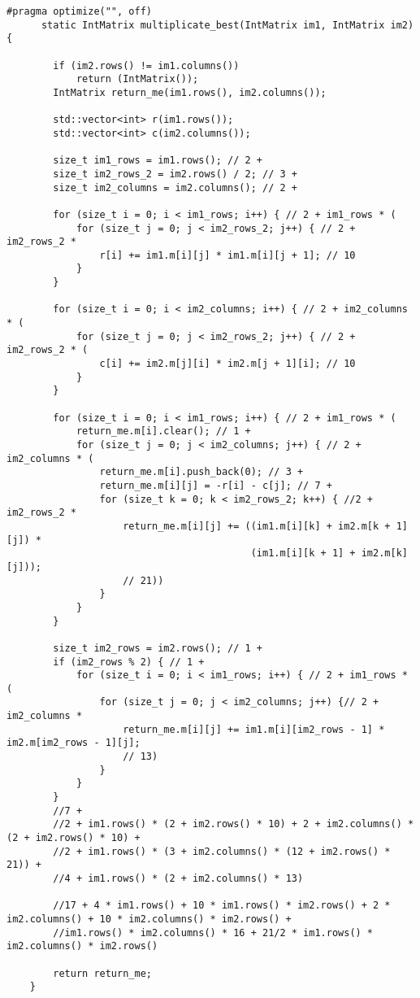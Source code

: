 \documentclass[a4paper, 14pt]{article}
\begin{document}
	\newpage
	\begin{lstlisting}[label=matrix-lev,caption=Алгоритм Виноградова с оптимизациями]
  #pragma optimize("", off)
      static IntMatrix multiplicate_best(IntMatrix im1, IntMatrix im2) {

        if (im2.rows() != im1.columns())
            return (IntMatrix());
        IntMatrix return_me(im1.rows(), im2.columns());

        std::vector<int> r(im1.rows());
        std::vector<int> c(im2.columns());

        size_t im1_rows = im1.rows(); // 2 +
        size_t im2_rows_2 = im2.rows() / 2; // 3 +
        size_t im2_columns = im2.columns(); // 2 +

        for (size_t i = 0; i < im1_rows; i++) { // 2 + im1_rows * (
            for (size_t j = 0; j < im2_rows_2; j++) { // 2 + im2_rows_2 *
                r[i] += im1.m[i][j] * im1.m[i][j + 1]; // 10
            }
        }

        for (size_t i = 0; i < im2_columns; i++) { // 2 + im2_columns * (
            for (size_t j = 0; j < im2_rows_2; j++) { // 2 + im2_rows_2 * (
                c[i] += im2.m[j][i] * im2.m[j + 1][i]; // 10
            }
        }

        for (size_t i = 0; i < im1_rows; i++) { // 2 + im1_rows * (
            return_me.m[i].clear(); // 1 +
            for (size_t j = 0; j < im2_columns; j++) { // 2 + im2_columns * (
                return_me.m[i].push_back(0); // 3 +
                return_me.m[i][j] = -r[i] - c[j]; // 7 +
                for (size_t k = 0; k < im2_rows_2; k++) { //2 + im2_rows_2 *
                    return_me.m[i][j] += ((im1.m[i][k] + im2.m[k + 1][j]) *
                                          (im1.m[i][k + 1] + im2.m[k][j]));
                    // 21))
                }
            }
        }

        size_t im2_rows = im2.rows(); // 1 +
        if (im2_rows % 2) { // 1 +
            for (size_t i = 0; i < im1_rows; i++) { // 2 + im1_rows * (
                for (size_t j = 0; j < im2_columns; j++) {// 2 + im2_columns *
                    return_me.m[i][j] += im1.m[i][im2_rows - 1] * im2.m[im2_rows - 1][j];
                    // 13)
                }
            }
        }
        //7 +
        //2 + im1.rows() * (2 + im2.rows() * 10) + 2 + im2.columns() * (2 + im2.rows() * 10) +
        //2 + im1.rows() * (3 + im2.columns() * (12 + im2.rows() * 21)) +
        //4 + im1.rows() * (2 + im2.columns() * 13)

        //17 + 4 * im1.rows() + 10 * im1.rows() * im2.rows() + 2 * im2.columns() + 10 * im2.columns() * im2.rows() +
        //im1.rows() * im2.columns() * 16 + 21/2 * im1.rows() * im2.columns() * im2.rows()

        return return_me;
    }
	\end{lstlisting}
	
\end{document}
